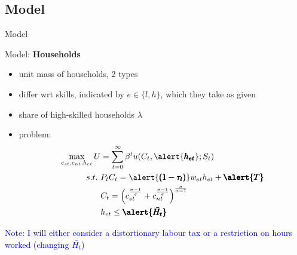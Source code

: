 \documentclass[11pt,aspectratio=169]{beamer}
\newcommand{\tr}[1]{\textcolor{blue}{#1}}
\begin{document}
\subsection{Model}
\begingroup
{}
\begin{frame}
	\huge{Model}
\end{frame}
\endgroup

\begin{frame}{Model: \textbf{Households}}
\begin{itemize}
	\item unit mass of households, 2 types
	\item differ wrt  skills, indicated by $e\in\{l,h\}$, which they take as given 
	\item share of high-skilled households $\lambda$
	\item problem: \vspace{-2mm}
	\begin{align*}
	\max_{c_{st}, c_{nt}, h_{et}}U&=\sum_{t=0}^{\infty}\beta^t u(C_t,\alert{\pmb{h_{et}}}; S_t)\\
	s.t.\ & P_t C_t=\alert{\pmb{(1-\tau_l)}}w_{et}h_{et}+\pmb{\alert{T}}\\
	& C_t= \left( c_{st}^{\frac{\sigma-1}{\sigma}}+c_{nt}^\frac{\sigma-1}{\sigma}\right)^\frac{\sigma}{\sigma-1}\\
	&h_{et}\leq \pmb{\alert{\bar{H_t}}}
	\end{align*}
\end{itemize}
\tr{Note: I will either consider a distortionary labour tax or a restriction on hours worked (changing $\bar{H_t}$)}
\end{frame}
\end{document}
